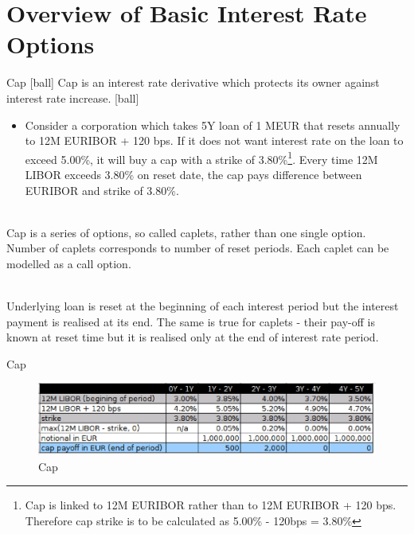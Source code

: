 \documentclass{beamer}
\begin{document}
\section{Overview of Basic Interest Rate Options}

\begin{frame}{Cap}
[ball]
Cap is an interest rate derivative which protects its owner against interest rate increase.
[ball]
\begin{itemize}
	\item Consider a corporation which takes 5Y loan of 1 MEUR that resets annually to 12M EURIBOR + 120 bps. If it does not want interest rate on the loan to exceed 5.00\%, it will buy a cap with a strike of 3.80\%\footnote{\tiny{Cap is linked to 12M EURIBOR rather than to 12M EURIBOR + 120 bps. Therefore cap strike is to be calculated as 5.00\% - 120bps = 3.80\%}}. Every time 12M LIBOR exceeds 3.80\% on reset date, the cap pays
difference between EURIBOR and strike of 3.80\%.
\end{itemize}

\mbox{}\\
Cap is a series of options, so called caplets, rather than one single option. Number of caplets corresponds to number of reset periods. Each caplet can be modelled as a call option.

\mbox{}\\
Underlying loan is reset at the beginning of each interest period but the interest payment is realised at its end. The same is true for caplets - their pay-off is known at reset time but it is realised only at the end of interest rate period.
\end{frame}

\begin{frame}{Cap}
\begin{figure}[htp]
\centering
\includegraphics[scale = 0.50]{cap.eps}
\caption{Cap}
\label{cap}
\end{figure}
\end{frame}
\end{document}
